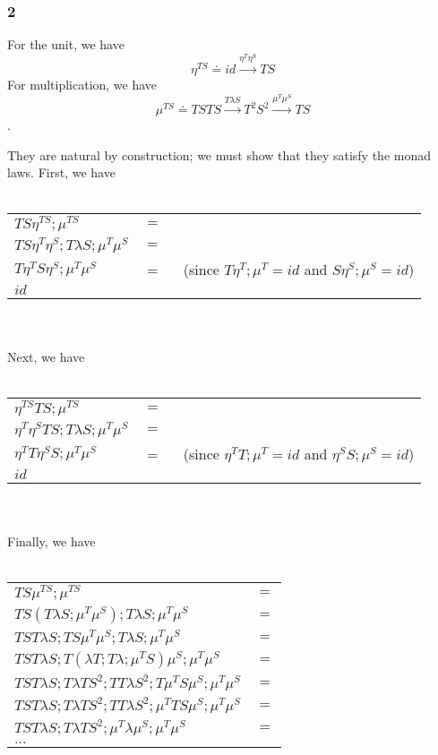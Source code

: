 \documentclass{article}
\begin{document}
\subsubsection*{2}

For the unit, we have $$\eta^{TS} \doteq \mathit{id} \overset{\eta^T \eta^S}{\longrightarrow} TS$$
For multiplication, we have 
$$\mu^{TS} \doteq TSTS \overset{T \lambda S}{\longrightarrow} T^2S^2 \overset{\mu^T \mu^S}{\longrightarrow} TS$$.

They are natural by construction; we must show that they satisfy the monad laws. 
First, we have\\~\\
\begin{tabular}{ll}
$TS\eta^{TS};\mu^{TS}$ & $=$ \\
$TS\eta^T\eta^S;T \lambda S;\mu^T\mu^S$ & $=$ \\
$T \eta^T S \eta^S;\mu^T\mu^S$ & $=$~~~(since $T\eta^T;\mu^T = id$ and $S\eta^S;\mu^S = id$) \\
$id$
\end{tabular}\\~\\
Next, we have\\~\\
\begin{tabular}{ll}
$\eta^{TS}TS;\mu^{TS}$ & $=$ \\
$\eta^T\eta^S T S;T \lambda S;\mu^T\mu^S$ & $=$ \\
$\eta^TT\eta^SS;\mu^T\mu^S$ & $=$~~~(since $\eta^T T;\mu^T = id$ and $\eta^S S; \mu^S = id$) \\
$id$
\end{tabular}\\~\\
Finally, we have\\~\\
\begin{tabular}{ll}
$TS\mu^{TS};\mu^{TS}$ & $=$ \\
$TS(T \lambda S;\mu^T\mu^S);T \lambda S;\mu^T \mu^S$ & $=$ \\
$TST \lambda S;TS\mu^T \mu^S;T \lambda S;\mu^T \mu^S$ & $=$ \\
$TST \lambda S;T(\lambda T;T\lambda;\mu^T S)\mu^S;\mu^T \mu^S$ & $=$ \\
$TST \lambda S;T \lambda T S^2;T T\lambda S^2;T \mu^T S \mu^S;\mu^T \mu^S$ & $=$ \\
$TST \lambda S;T \lambda T S^2;T T\lambda S^2;\mu^T T S \mu^S;\mu^T \mu^S$ & $=$ \\
$TST \lambda S;T \lambda T S^2;\mu^T \lambda \mu^S;\mu^T \mu^S$ & $=$ \\
$\ldots$
\end{tabular}
\end{document}
